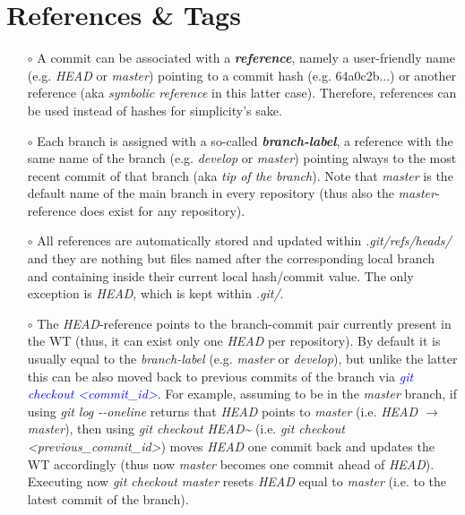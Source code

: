 \documentclass[a4paper,portrait,10pt]{article}   %
\newcommand{\mycmd}[1]{\textcolor{blue}{\textit{#1}}}   %
\newcommand{\myvspace}{\vspace{4mm}}   %
\begin{document}

\section{References \& Tags}   \label{sec:RefsTags}

\begin{itemize}
\item[$\circ$] A commit can be associated with a \textbf{\textit{reference}}, namely a user-friendly name (e.g. \textit{HEAD} or \textit{master}) pointing to a commit hash (e.g. 64a0c2b...) or another reference (aka \textit{symbolic reference} in this latter case). Therefore, references can be used instead of hashes for simplicity's sake.
\myvspace

\item[$\circ$] Each branch is assigned with a so-called \textbf{\textit{branch-label}}, a reference with the same name of the branch (e.g. \textit{develop} or \textit{master}) pointing always to the most recent commit of that branch (aka \textit{tip of the branch}). Note that \textit{master} is the default name of the main branch in every repository (thus also the \textit{master}-reference does exist for any repository).
\myvspace

\item[$\circ$] All references are automatically stored and updated within \textit{.git/refs/heads/} and they are nothing but files named after the corresponding local branch and containing inside their current local hash/commit value. The only exception is \textit{HEAD}, which is kept within \textit{.git/}.
\myvspace

\item[$\circ$] The \textit{HEAD}-reference points to the branch-commit pair currently present in the WT (thus, it can exist only one \textit{HEAD} per repository). By default it is usually equal to the \textit{branch-label} (e.g. \textit{master} or \textit{develop}), but unlike the latter this can be also moved back to previous commits of the branch via \mycmd{git checkout <commit\_id>}. For example, assuming to be in the \textit{master} branch, if using \textit{git log -{}-oneline} returns that \textit{HEAD} points to \textit{master} (i.e. \textit{HEAD $\rightarrow$ master}), then using \textit{git checkout HEAD\textasciitilde} (i.e. \textit{git checkout <previous\_commit\_id>}) moves \textit{HEAD} one commit back and updates the WT accordingly (thus now \textit{master} becomes one commit ahead of \textit{HEAD}). Executing now \textit{git checkout master} resets \textit{HEAD} equal to \textit{master} (i.e. to the latest commit of the branch).
\myvspace


\end{itemize}
\end{document}
